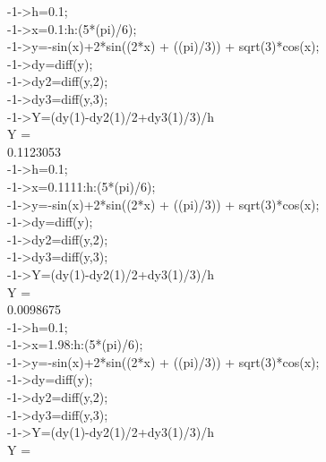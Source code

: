 \documentclass[russian,utf8,nocolumnxxxi,nocolumnxxxii]{eskdtext}
\begin{document}
-1->h=0.1;\\

-1->x=0.1:h:(5*(pi)/6);\\

-1->y=-sin(x)+2*sin((2*x) + ((pi)/3)) + sqrt(3)*cos(x);\\



-1->dy=diff(y);\\

-1->dy2=diff(y,2);\\

-1->dy3=diff(y,3);\\

-1->Y=(dy(1)-dy2(1)/2+dy3(1)/3)/h\\
 Y  =\\

    0.1123053  \\

-1->h=0.1;\\

-1->x=0.1111:h:(5*(pi)/6);\\

-1->y=-sin(x)+2*sin((2*x) + ((pi)/3)) + sqrt(3)*cos(x);\\

-1->dy=diff(y);\\

-1->dy2=diff(y,2);\\

-1->dy3=diff(y,3);\\


-1->Y=(dy(1)-dy2(1)/2+dy3(1)/3)/h\\
 Y  =\\

    0.0098675 \\

-1->h=0.1;\\

-1->x=1.98:h:(5*(pi)/6);\\

-1->y=-sin(x)+2*sin((2*x) + ((pi)/3)) + sqrt(3)*cos(x);\\

-1->dy=diff(y);\\

-1->dy2=diff(y,2);\\

-1->dy3=diff(y,3);\\

-1->Y=(dy(1)-dy2(1)/2+dy3(1)/3)/h\\
 Y  =\\
\end{document}
